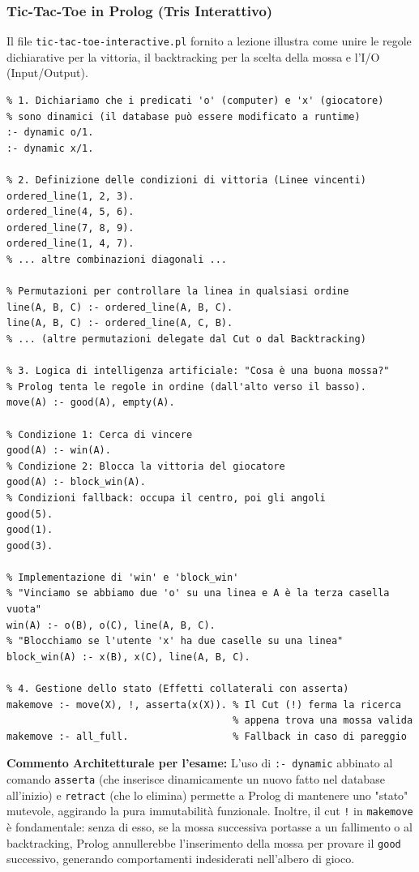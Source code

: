 \documentclass[12pt, a4paper]{article}
\begin{document}
\newpage

\subsubsection{Tic-Tac-Toe in Prolog (Tris Interattivo)}
Il file \texttt{tic-tac-toe-interactive.pl} fornito a lezione illustra come unire le regole dichiarative per la vittoria, il backtracking per la scelta della mossa e l'I/O (Input/Output).

\begin{verbatim}
% 1. Dichiariamo che i predicati 'o' (computer) e 'x' (giocatore) 
% sono dinamici (il database può essere modificato a runtime)
:- dynamic o/1.
:- dynamic x/1.

% 2. Definizione delle condizioni di vittoria (Linee vincenti)
ordered_line(1, 2, 3).
ordered_line(4, 5, 6).
ordered_line(7, 8, 9).
ordered_line(1, 4, 7).
% ... altre combinazioni diagonali ...

% Permutazioni per controllare la linea in qualsiasi ordine
line(A, B, C) :- ordered_line(A, B, C).
line(A, B, C) :- ordered_line(A, C, B).
% ... (altre permutazioni delegate dal Cut o dal Backtracking)

% 3. Logica di intelligenza artificiale: "Cosa è una buona mossa?"
% Prolog tenta le regole in ordine (dall'alto verso il basso).
move(A) :- good(A), empty(A).

% Condizione 1: Cerca di vincere
good(A) :- win(A).
% Condizione 2: Blocca la vittoria del giocatore
good(A) :- block_win(A).
% Condizioni fallback: occupa il centro, poi gli angoli
good(5).
good(1).
good(3).

% Implementazione di 'win' e 'block_win'
% "Vinciamo se abbiamo due 'o' su una linea e A è la terza casella vuota"
win(A) :- o(B), o(C), line(A, B, C).
% "Blocchiamo se l'utente 'x' ha due caselle su una linea"
block_win(A) :- x(B), x(C), line(A, B, C).

% 4. Gestione dello stato (Effetti collaterali con asserta)
makemove :- move(X), !, asserta(x(X)). % Il Cut (!) ferma la ricerca 
                                       % appena trova una mossa valida
makemove :- all_full.                  % Fallback in caso di pareggio
\end{verbatim}

\newpage

\textbf{Commento Architetturale per l'esame:}
L'uso di \texttt{:- dynamic} abbinato al comando \texttt{asserta} (che inserisce dinamicamente un nuovo fatto nel database all'inizio) e \texttt{retract} (che lo elimina) permette a Prolog di mantenere uno "stato" mutevole, aggirando la pura immutabilità funzionale.
Inoltre, il cut \texttt{!} in \texttt{makemove} è fondamentale: senza di esso, se la mossa successiva portasse a un fallimento o al backtracking, Prolog annullerebbe l'inserimento della mossa per provare il \texttt{good} successivo, generando comportamenti indesiderati nell'albero di gioco.
\end{document}
